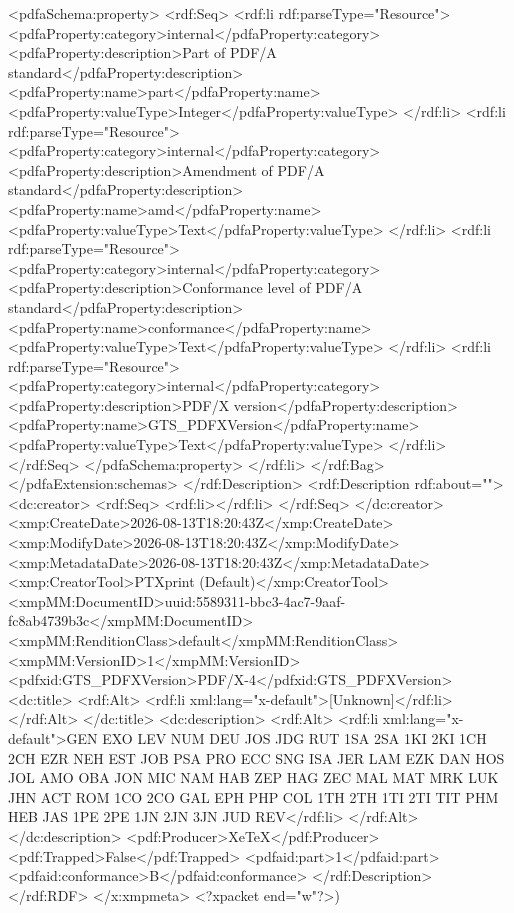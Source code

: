 {              <pdfaSchema:property>
                <rdf:Seq>
                  <rdf:li rdf:parseType="Resource">
                    <pdfaProperty:category>internal</pdfaProperty:category>
                    <pdfaProperty:description>Part of PDF/A standard</pdfaProperty:description>
                    <pdfaProperty:name>part</pdfaProperty:name>
                    <pdfaProperty:valueType>Integer</pdfaProperty:valueType>
                  </rdf:li>
                  <rdf:li rdf:parseType="Resource">
                    <pdfaProperty:category>internal</pdfaProperty:category>
                    <pdfaProperty:description>Amendment of PDF/A standard</pdfaProperty:description>
                    <pdfaProperty:name>amd</pdfaProperty:name>
                    <pdfaProperty:valueType>Text</pdfaProperty:valueType>
                  </rdf:li>
                  <rdf:li rdf:parseType="Resource">
                    <pdfaProperty:category>internal</pdfaProperty:category>
                    <pdfaProperty:description>Conformance level of PDF/A standard</pdfaProperty:description>
                    <pdfaProperty:name>conformance</pdfaProperty:name>
                    <pdfaProperty:valueType>Text</pdfaProperty:valueType>
                  </rdf:li>
                  <rdf:li rdf:parseType="Resource">
                    <pdfaProperty:category>internal</pdfaProperty:category>
                    <pdfaProperty:description>PDF/X version</pdfaProperty:description>
                    <pdfaProperty:name>GTS_PDFXVersion</pdfaProperty:name>
                    <pdfaProperty:valueType>Text</pdfaProperty:valueType>
                  </rdf:li>
                </rdf:Seq>
              </pdfaSchema:property>
            </rdf:li>
          </rdf:Bag>
        </pdfaExtension:schemas>
      </rdf:Description>
      <rdf:Description rdf:about="">
        <dc:creator>
          <rdf:Seq>
            <rdf:li></rdf:li>
          </rdf:Seq>
        </dc:creator>
        <xmp:CreateDate>2026-08-13T18:20:43Z</xmp:CreateDate>
        <xmp:ModifyDate>2026-08-13T18:20:43Z</xmp:ModifyDate>
        <xmp:MetadataDate>2026-08-13T18:20:43Z</xmp:MetadataDate>
        <xmp:CreatorTool>PTXprint (Default)</xmp:CreatorTool>
        <xmpMM:DocumentID>uuid:5589311-bbc3-4ac7-9aaf-fc8ab4739b3c</xmpMM:DocumentID>
        <xmpMM:RenditionClass>default</xmpMM:RenditionClass>
        <xmpMM:VersionID>1</xmpMM:VersionID>
        <pdfxid:GTS_PDFXVersion>PDF/X-4</pdfxid:GTS_PDFXVersion>
        <dc:title>
          <rdf:Alt>
            <rdf:li xml:lang="x-default">[Unknown]</rdf:li>
          </rdf:Alt>
        </dc:title>
        <dc:description>
          <rdf:Alt>
            <rdf:li xml:lang="x-default">GEN EXO LEV NUM DEU JOS JDG RUT 1SA 2SA 1KI 2KI 1CH 2CH EZR NEH EST JOB PSA PRO ECC SNG ISA JER LAM EZK DAN HOS JOL AMO OBA JON MIC NAM HAB ZEP HAG ZEC MAL MAT MRK LUK JHN ACT ROM 1CO 2CO GAL EPH PHP COL 1TH 2TH 1TI 2TI TIT PHM HEB JAS 1PE 2PE 1JN 2JN 3JN JUD REV</rdf:li>
          </rdf:Alt>
        </dc:description>
        <pdf:Producer>XeTeX</pdf:Producer>
        <pdf:Trapped>False</pdf:Trapped>
      <pdfaid:part>1</pdfaid:part>
      <pdfaid:conformance>B</pdfaid:conformance>
      </rdf:Description>
  </rdf:RDF>
</x:xmpmeta>
<?xpacket end="w"?>)}
